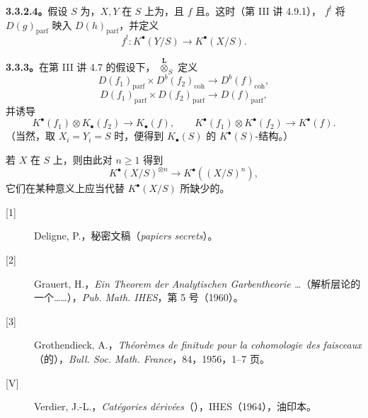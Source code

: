 \textbf{3.3.2.4。}假设 $S$ 为，$X,Y$ 在 $S$ 上为，且 $f$ 且。这时（第 III 讲 4.9.1）， $f^!$ 将 $D(g)_{\mathrm{parf}}$ 映入 $D(h)_{\mathrm{parf}}$，并定义
\[f^!:K^\bullet(Y/S)\longrightarrow K^\bullet(X/S).\]

\textbf{3.3.3。}在第 III 讲 4.7 的假设下， $\mathbin{\overset{\mathbf L}{\otimes}}_S$ 定义
\[D(f_1)_{\mathrm{parf}}\times D^b(f_2)_{\mathrm{coh}}\longrightarrow D^b(f)_{\mathrm{coh}},\]
\[D(f_1)_{\mathrm{parf}}\times D(f_2)_{\mathrm{parf}}\longrightarrow D(f)_{\mathrm{parf}},\]
并诱导
\[K^\bullet(f_1)\otimes K_\bullet(f_2)\longrightarrow K_\bullet(f),\qquad K^\bullet(f_1)\otimes K^\bullet(f_2)\longrightarrow K^\bullet(f).\]
（当然，取 $X_i=Y_i=S$ 时，便得到 $K_\bullet(S)$ 的 $K^\bullet(S)$-结构。）

若 $X$ 在 $S$ 上，则由此对 $n\geq1$ 得到
\[K^\bullet(X/S)^{\otimes n}\longrightarrow K^\bullet((X/S)^n),\]
它们在某种意义上应当代替 $K^\bullet(X/S)$ 所缺少的。

\begin{description}
\item[{[1]}] Deligne, P.，秘密文稿（\emph{papiers secrets}）。
\item[{[2]}] Grauert, H.，\emph{Ein Theorem der Analytischen Garbentheorie \ldots}（解析层论的一个……），\emph{Pub. Math. IHES}，第 5 号（1960）。
\item[{[3]}] Grothendieck, A.，\emph{Théorèmes de finitude pour la cohomologie des faisceaux}（的），\emph{Bull. Soc. Math. France}，84，1956，1--7 页。
\item[{[V]}] Verdier, J.-L.，\emph{Catégories dérivées}（），IHES（1964），油印本。
\end{description}
